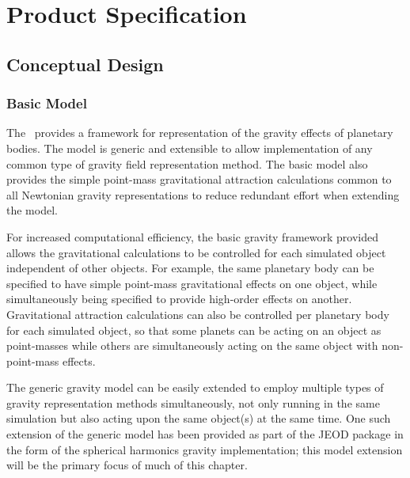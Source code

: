 %
%      
%   
%
%

\chapter{Product Specification}\label{ch:spec}

\section{Conceptual Design}
\subsection{Basic Model}
The \ModelDesc\ provides a framework for representation of the gravity effects
of planetary bodies. The model is generic and extensible to allow
implementation of any common type of gravity field representation method. The
basic model also provides the simple point-mass gravitational attraction
calculations common to all Newtonian gravity representations to reduce
redundant effort when extending the model.

For increased computational efficiency, the basic gravity framework provided
allows the gravitational calculations to be controlled for each simulated
object independent of other objects. For example, the same planetary body
can be specified to have simple point-mass gravitational effects on one
object, while simultaneously being specified to provide high-order effects
on another. Gravitational attraction calculations can also be controlled per
planetary body for each simulated object, so that some planets can be acting
on an object as point-masses while others are simultaneously acting on the
same object with non-point-mass effects.

The generic gravity model can be easily extended to employ multiple types of
gravity representation methods simultaneously, not only running in the same
simulation but also acting upon the same object(s) at the same time. One such
extension of the generic model has been provided as part of the JEOD package
in the form of the spherical harmonics gravity implementation; this model
extension will be the primary focus of much of this chapter. 

